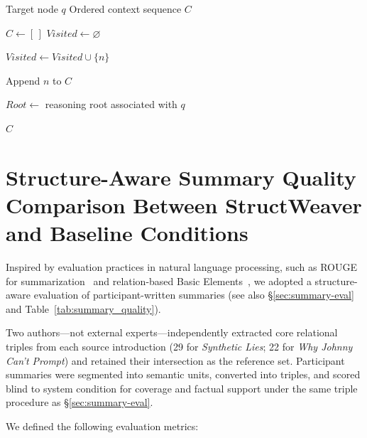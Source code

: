 \documentclass[manuscript,review,anonymous]{acmart}
\begin{document}
\begin{algorithm}[t]
\caption{Path-Based Context Construction}
\label{alg:context}
\small
\begin{algorithmic}[1]

\Require Target node $q$
\Ensure Ordered context sequence $C$

\State $C \leftarrow [\,]$
\State $Visited \leftarrow \varnothing$


 \State \Return
 \EndIf

 \State $Visited \leftarrow Visited \cup \{n\}$

 \State Append $n$ to $C$

 \State {}
 \EndFor

 \State {}
 \EndFor

\EndProcedure

\State $Root \leftarrow$ reasoning root associated with $q$

\State {}

\State \Return $C$

\end{algorithmic}
\end{algorithm}

\section{Structure-Aware Summary Quality Comparison Between StructWeaver and Baseline Conditions}

Inspired by evaluation practices in natural language processing, such as ROUGE for summarization~\cite{lin-2004-rouge} and relation-based Basic Elements~\cite{hovy-etal-2006-automated}, we adopted a structure-aware evaluation of participant-written summaries (see also \S\ref{sec:summary-eval} and Table~\ref{tab:summary_quality}).

Two authors---not external experts---independently extracted core relational triples from each source introduction (29 for \textit{Synthetic Lies}; 22 for \textit{Why Johnny Can't Prompt}) and retained their intersection as the reference set. Participant summaries were segmented into semantic units, converted into triples, and scored blind to system condition for coverage and factual support under the same triple procedure as \S\ref{sec:summary-eval}.

We defined the following evaluation metrics:
\end{document}
